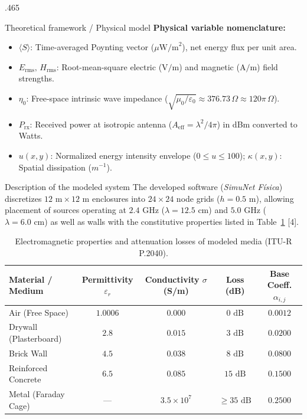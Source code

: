 \documentclass[final]{beamer}
\begin{document}
\begin{frame}[t]
\begin{columns}[t]
\begin{column}{.465\paperwidth}
\begin{block}{Theoretical framework / Physical model}
					\vspace{0.15cm}
					\textbf{Physical variable nomenclature:}
					\begin{itemize}
						\item \(\langle S \rangle\): Time-averaged Poynting vector (\(\mu\text{W/m}^2\)), net energy flux per unit area.
						\item \(E_{\text{rms}},\, H_{\text{rms}}\): Root-mean-square electric (\(\text{V/m}\)) and magnetic (\(\text{A/m}\)) field strengths.
						\item \(\eta_0\): Free-space intrinsic wave impedance (\(\sqrt{\mu_0/\varepsilon_0} \approx 376.73\,\Omega \approx 120\pi\,\Omega\)).
						\item \(P_{\text{rx}}\): Received power at isotropic antenna (\(A_{\text{eff}} = \lambda^2/4\pi\)) in dBm converted to Watts.
						\item \(u(x,y)\): Normalized energy intensity envelope (\(0 \le u \le 100\)); \(\kappa(x,y)\): Spatial dissipation (\(m^{-1}\)).
					\end{itemize}
				\end{block}
				
				\begin{block}{Description of the modeled system}
					The developed software (\textit{SimuNet Física}) discretizes \(12\text{ m} \times 12\text{ m}\) enclosures into \(24 \times 24\) node grids (\(h = 0.5\text{ m}\)), allowing placement of sources operating at \(2.4\text{ GHz}\) (\(\lambda = 12.5\text{ cm}\)) and \(5.0\text{ GHz}\) (\(\lambda = 6.0\text{ cm}\)) as well as walls with the constitutive properties listed in Table~\ref{tab:materials} [4].
					
					\begin{table}
						\centering
						\caption{Electromagnetic properties and attenuation losses of modeled media (ITU-R P.2040).}
						\label{tab:materials}
						\fontsize{20}{26}\selectfont
						\begin{tabular}{|l|c|c|c|c|}
							\hline
							\rowcolor{azulMarino!20}
							\textbf{Material / Medium} & \textbf{Permittivity \(\varepsilon_r\)} & \textbf{Conductivity \(\sigma\) (S/m)} & \textbf{Loss (dB)} & \textbf{Base Coeff. \(\alpha_{i,j}\)} \\
							\hline
							Air (Free Space) & \(1.0006\) & \(0.000\) & \(0\text{ dB}\) & \(0.0012\) \\
							\hline
							Drywall (Plasterboard) & \(2.8\) & \(0.015\) & \(3\text{ dB}\) & \(0.0200\) \\
							\hline
							Brick Wall & \(4.5\) & \(0.038\) & \(8\text{ dB}\) & \(0.0800\) \\
							\hline
							Reinforced Concrete & \(6.5\) & \(0.085\) & \(15\text{ dB}\) & \(0.1500\) \\
							\hline
							Metal (Faraday Cage) & — & \(3.5 \times 10^7\) & \(\ge 35\text{ dB}\) & \(0.2500\) \\
							\hline
						\end{tabular}
					\end{table}
					

\end{block}
\end{column}
\end{columns}
\end{frame}
\end{document}
